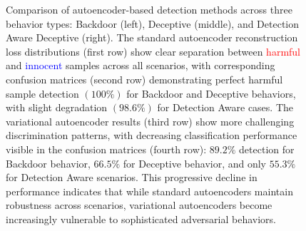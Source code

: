 \begin{figure}[htbp]
    \caption{\small{Comparison of autoencoder-based detection methods across three behavior types: Backdoor (left), Deceptive (middle), and Detection Aware Deceptive (right). The standard autoencoder reconstruction loss distributions (first row) show clear separation between \textcolor{Red}{harmful} and \textcolor{Blue}{innocent} samples across all scenarios, with corresponding confusion matrices (second row) demonstrating perfect harmful sample detection $(100\%)$ for Backdoor and Deceptive behaviors, with slight degradation $(98.6\%)$ for Detection Aware cases. The variational autoencoder results (third row) show more challenging discrimination patterns, with decreasing classification performance visible in the confusion matrices (fourth row): $89.2\%$ detection for Backdoor behavior, $66.5\%$ for Deceptive behavior, and only $55.3\%$ for Detection Aware scenarios. This progressive decline in performance indicates that while standard autoencoders maintain robustness across scenarios, variational autoencoders become increasingly vulnerable to sophisticated adversarial behaviors.}}
    
    \label{fig:l3actnsae}

\end{figure}




